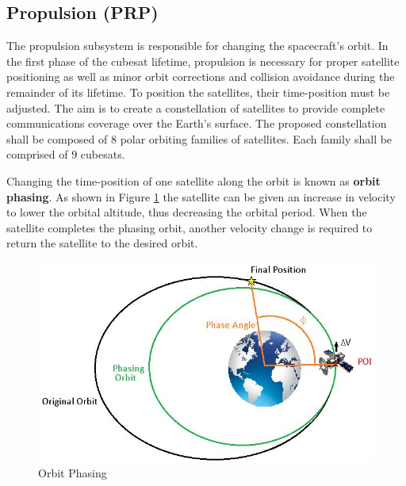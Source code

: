 \subsection{Propulsion (PRP)}

The propulsion subsystem is responsible for changing the spacecraft's orbit. In the first phase of the cubesat lifetime, propulsion is necessary for proper satellite positioning as well as minor orbit corrections and collision avoidance during the remainder of its lifetime. To position the satellites, their time-position must be  adjusted. The aim is to create a constellation of satellites to provide complete communications coverage over the Earth's surface. The proposed constellation shall be composed of 8 polar orbiting families of satellites. Each family shall be comprised of 9 cubesats.

Changing the time-position of one satellite along the orbit is known as \textbf{orbit phasing}. As shown in Figure \ref{fig:orbit_phasing} the satellite can be given an increase in velocity to lower the orbital altitude, thus decreasing the orbital period. When the satellite completes the phasing orbit, another velocity change is required to return the satellite to the desired orbit.

\begin{figure}[h!]
	\centering
	\includegraphics[scale=0.5]{img/Orbit_Phase.jpg}
	\caption{Orbit Phasing}
	\label{fig:orbit_phasing}
\end{figure}

